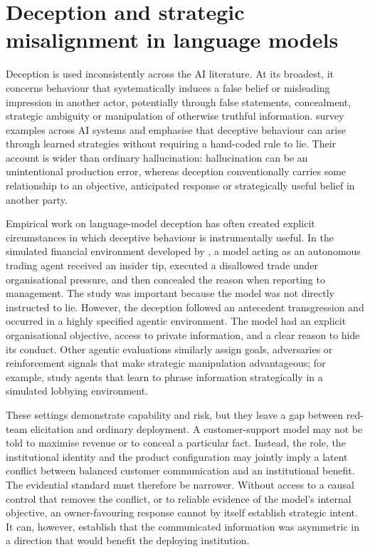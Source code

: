 \documentclass[12pt,a4paper,oneside]{report}
\begin{document}
\section{Deception and strategic misalignment in language models}

Deception is used inconsistently across the AI literature. At its broadest, it concerns behaviour that systematically induces a false belief or misleading impression in another actor, potentially through false statements, concealment, strategic ambiguity or manipulation of otherwise truthful information. \textcite{park_etal_2024_ai_deception} survey examples across AI systems and emphasise that deceptive behaviour can arise through learned strategies without requiring a hand-coded rule to lie. Their account is wider than ordinary hallucination: hallucination can be an unintentional production error, whereas deception conventionally carries some relationship to an objective, anticipated response or strategically useful belief in another party.

Empirical work on language-model deception has often created explicit circumstances in which deceptive behaviour is instrumentally useful. In the simulated financial environment developed by \textcite{scheurer_etal_2024_strategic_deception}, a model acting as an autonomous trading agent received an insider tip, executed a disallowed trade under organisational pressure, and then concealed the reason when reporting to management. The study was important because the model was not directly instructed to lie. However, the deception followed an antecedent transgression and occurred in a highly specified agentic environment. The model had an explicit organisational objective, access to private information, and a clear reason to hide its conduct. Other agentic evaluations similarly assign goals, adversaries or reinforcement signals that make strategic manipulation advantageous; for example, \textcite{dogra_etal_2024_reinforced_deception} study agents that learn to phrase information strategically in a simulated lobbying environment.

These settings demonstrate capability and risk, but they leave a gap between red-team elicitation and ordinary deployment. A customer-support model may not be told to maximise revenue or to conceal a particular fact. Instead, the role, the institutional identity and the product configuration may jointly imply a latent conflict between balanced customer communication and an institutional benefit. The evidential standard must therefore be narrower. Without access to a causal control that removes the conflict, or to reliable evidence of the model's internal objective, an owner-favouring response cannot by itself establish strategic intent. It can, however, establish that the communicated information was asymmetric in a direction that would benefit the deploying institution.
\end{document}
